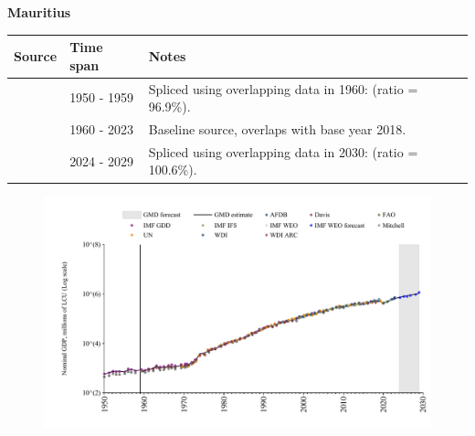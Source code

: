 \documentclass[12pt,a4paper,landscape]{article}
\begin{document}
\begin{adjustbox}{max totalsize={\paperwidth}{\paperheight},center}
\begin{minipage}[t][\textheight][t]{\textwidth}
\vspace*{0.5cm}
{}
\begin{center}
{\Large\bfseries Mauritius}
\end{center}
\vspace{0.5cm}
\begin{table}[H]
\centering
\small
\begin{tabular}{|l|l|l|}
\hline
\textbf{Source} & \textbf{Time span} & \textbf{Notes} \\
\hline
\rowcolor{white}\cite{IMF_GDD}& 1950 - 1959 &Spliced using overlapping data in 1960: (ratio = 96.9\%).\\
\rowcolor{lightgray}\cite{WDI}& 1960 - 2023 &Baseline source, overlaps with base year 2018.\\
\rowcolor{white}\cite{IMF_WEO_forecast}& 2024 - 2029 &Spliced using overlapping data in 2030: (ratio = 100.6\%).\\
\hline
\end{tabular}
\end{table}
\begin{figure}[H]
\centering
\includegraphics[width=\textwidth,height=0.6\textheight,keepaspectratio]{graphs/MUS_nGDP.pdf}
\end{figure}
\end{minipage}
\end{adjustbox}
\end{document}
